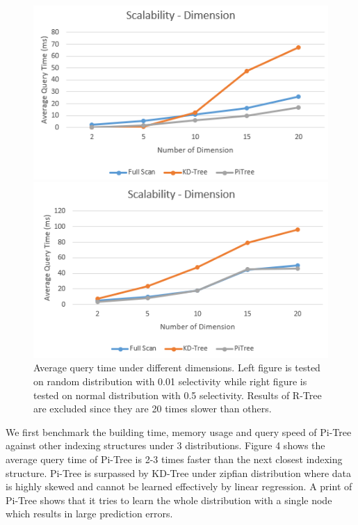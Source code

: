 \documentclass[sigconf,10pt]{acmart}
\begin{document}
\begin{figure}[t] 
  \label{scalability-dimension} 
  \begin{minipage}[b]{0.45\linewidth}
    \centering
    \includegraphics[width=.8\linewidth]{../figures/scalability/dimension-random} 
    \vspace{4ex}
  \end{minipage}%
  \begin{minipage}[b]{0.45\linewidth}
    \centering
    \includegraphics[width=.8\linewidth]{../figures/scalability/dimension-normal} 
    \vspace{4ex}
  \end{minipage}%
  \caption{Average query time under different dimensions. Left figure is tested
  on random distribution with 0.01 selectivity while right figure is tested on normal distribution
  with 0.5 selectivity.
  Results of R-Tree are excluded since they are 20 times slower than others.}
\end{figure}

We first benchmark the building time, memory usage and query speed of Pi-Tree against
other indexing structures under 3 distributions. Figure 4 shows the average query time of
Pi-Tree is 2-3 times faster than the next closest indexing structure. Pi-Tree is surpassed by
KD-Tree under zipfian distribution where data is highly skewed and cannot be learned effectively
by linear regression. A print of Pi-Tree shows that it tries to learn the whole distribution
with a single node which results in large prediction errors.
\end{document}
